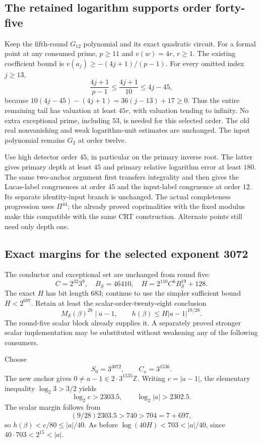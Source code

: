 \subsection{The retained logarithm supports order forty-five}

Keep the fifth-round $G_{12}$ polynomial and its exact quadratic circuit.
For a formal point at any consumed prime, $p\ge11$ and $v(w)=4r$,
$r\ge1$. The existing coefficient bound is
$v(a_j)\ge-(4j+1)/(p-1)$. For every omitted index $j\ge13$,
\[
 \frac{4j+1}{p-1}\le\frac{4j+1}{10}\le4j-45,
\]
because $10(4j-45)-(4j+1)=36(j-13)+17\ge0$.
Thus the entire remaining tail has valuation at least $45r$, with
valuation tending to infinity. No extra exceptional prime, including
$53$, is needed for this selected order. The old real nonvanishing and
weak logarithm-unit estimates are unchanged. The input polynomial
remains $G_2$ at order twelve.

Use high detector order $45$, in particular on the primary inverse root.
The latter gives primary depth at least $45$ and primary relative
logarithm error at least $180$. The same two-anchor argument first
transfers integrality and then gives the Lucas-label congruences at
order $45$ and the input-label congruence at order $12$. Its separate
identity-input branch is unchanged. The actual completeness progression
uses $\Pi^{44}$; the already proved coprimalities with the fixed modulus
make this compatible with the same CRT construction. Alternate points
still need only depth one.

\subsection{Exact margins for the selected exponent 3072}

The conductor and exceptional set are unchanged from round five:
\[
 C=2^{32}3^9,\quad B_{\mathcal S}=46410,\quad
 H=2^{110}C^6 B_{\mathcal S}^{19}+128.
\]
The exact $H$ has bit length $683$; continue to use the simpler
sufficient bound $H<2^{697}$. Retain at least the scalar-order-twenty-eight
conclusion
\[
 M_{\mathcal S}(\beta)^{28}\mid a-1,
 \qquad h(\beta)\le H|a-1|^{19/28}.
\]
The round-five scalar block already supplies it. A separately proved
stronger scalar implementation may be substituted without weakening
any of the following consumers.

Choose
\[
 S_0=3^{3072},\qquad C_a=3^{1536}.
\]
The new anchor gives $0\ne a-1\in2\cdot3^{1535}\mathbb Z$.
Writing $c=|a-1|$, the elementary inequality $\log_2 3>3/2$ yields
\[
 \log_2 c>2303.5,\qquad \log_2|a|>2302.5.
\]
The scalar margin follows from
\[
 (9/28)2303.5>740>704=7+697,
\]
so $h(\beta)<c/80\le|a|/40$.
As before $\log(40H)<703<|a|/40$, since $40\cdot703<2^{15}<|a|$.

